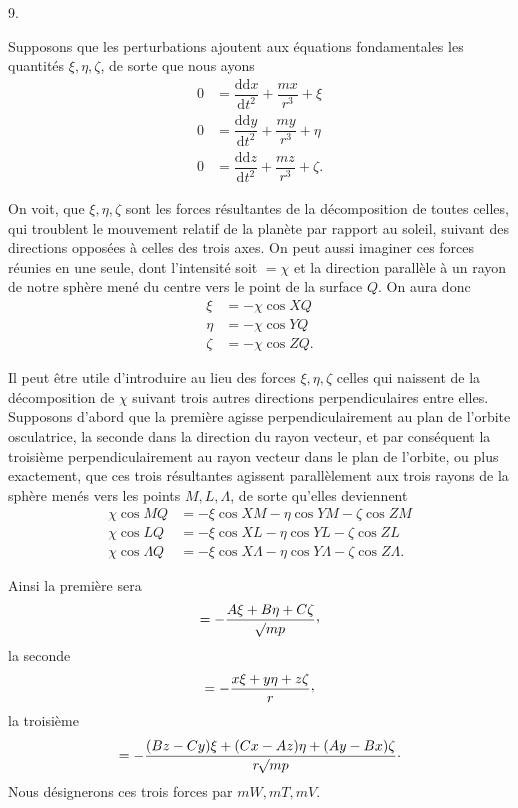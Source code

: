 \par{}\bigskip
{}
\begin{center}9.\end{center}
\noindent\hspace*{\parindent}Supposons que les perturbations ajoutent aux équations fondamentales les quantités \(\xi,\eta,\zeta\), de sorte que nous ayons
\[
\begin{aligned}
0&=\dfrac{\mathrm{dd}x}{\mathrm{d}t^2}+\dfrac{mx}{r^3}+\xi\\[5pt]
0&=\dfrac{\mathrm{dd}y}{\mathrm{d}t^2}+\dfrac{my}{r^3}+\eta\\[5pt]
0&=\dfrac{\mathrm{dd}z}{\mathrm{d}t^2}+\dfrac{mz}{r^3}+\zeta.
\end{aligned}
\]
\par On voit, que \(\xi,\eta,\zeta\) sont les forces résultantes de la décomposition de toutes celles, qui troublent le mouvement relatif de la planète par rapport au soleil, suivant des directions opposées à celles des trois axes. On peut aussi imaginer ces forces réunies en une seule, dont l’intensité soit \(=\chi\) et la direction parallèle à un rayon de notre sphère mené du centre vers le point de la surface \(Q\). On aura donc
\[
\begin{aligned}
\xi&=-\chi\cos XQ\\
\eta&=-\chi\cos YQ\\
\zeta&=-\chi\cos ZQ.
\end{aligned}
\]
\par Il peut être utile d’introduire au lieu des forces \(\xi,\eta,\zeta\) celles qui naissent de la décomposition de \(\chi\) suivant trois autres directions perpendiculaires entre elles. Supposons d’abord que la première agisse perpendiculairement au plan de l’orbite osculatrice, la seconde dans la direction du rayon vecteur, et par conséquent la troisième perpendiculairement au rayon vecteur dans le plan de l’orbite, ou plus exactement, que ces trois résultantes agissent parallèlement aux trois rayons de la sphère menés vers les points \(M,L,\Lambda\), de sorte qu’elles deviennent
\[
\begin{aligned}
\chi\cos MQ&=-\xi\cos XM-\eta\cos YM-\zeta\cos ZM\\
\chi\cos LQ&=-\xi\cos XL-\eta\cos YL-\zeta\cos ZL\\
\chi\cos\Lambda Q&=-\xi\cos X\Lambda-\eta\cos Y\Lambda-\zeta\cos Z\Lambda.
\end{aligned}
\]
\par Ainsi la première sera
\[
=-\dfrac{A\xi+B\eta+C\zeta}{\BareRoot{mp}}\mathpunct{\raisebox{.45ex}{,}}
\]
la seconde
\[
=-\dfrac{x\xi+y\eta+z\zeta}{r}\mathpunct{\raisebox{.45ex}{,}}
\]
la troisième
\[
=-\dfrac{(Bz-Cy)\xi+(Cx-Az)\eta+(Ay-Bx)\zeta}{r\mathord{{}^{}\!\surd}mp}\mathpunct{\cdot}
\]
Nous désignerons ces trois forces par \(mW,mT,mV\).
